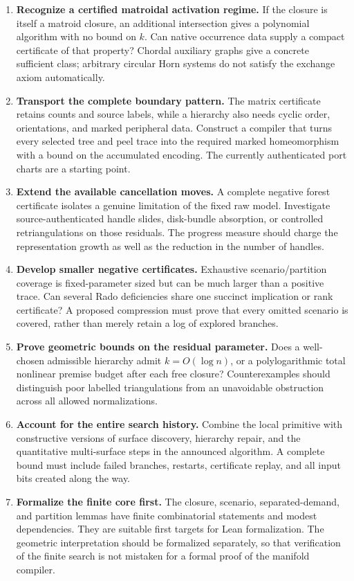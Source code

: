 \begin{enumerate}[leftmargin=*,label=\textbf{\arabic*.}]
\item \textbf{Recognize a certified matroidal activation regime.}
If the closure is itself a matroid closure, an additional intersection
gives a polynomial algorithm with no bound on $k$. Can native occurrence
data supply a compact certificate of that property? Chordal auxiliary
graphs give a concrete sufficient class; arbitrary circular Horn systems
do not satisfy the exchange axiom automatically.

\item \textbf{Transport the complete boundary pattern.}
The matrix certificate retains counts and source labels, while a hierarchy
also needs cyclic order, orientations, and marked peripheral data.
Construct a compiler that turns every selected tree and peel trace into
the required marked homeomorphism with a bound on the accumulated encoding.
The currently authenticated port charts are a starting point.

\item \textbf{Extend the available cancellation moves.}
A complete negative forest certificate isolates a genuine limitation of
the fixed raw model. Investigate source-authenticated handle slides,
disk-bundle absorption, or controlled retriangulations on those residuals.
The progress measure should charge the representation growth as well as
the reduction in the number of handles.

\item \textbf{Develop smaller negative certificates.}
Exhaustive scenario/partition coverage is fixed-parameter sized but can
be much larger than a positive trace. Can several Rado deficiencies share
one succinct implication or rank certificate? A proposed compression must
prove that every omitted scenario is covered, rather than merely retain
a log of explored branches.

\item \textbf{Prove geometric bounds on the residual parameter.}
Does a well-chosen admissible hierarchy admit $k=O(\log n)$, or a
polylogarithmic total nonlinear premise budget after each free closure?
Counterexamples should distinguish poor labelled triangulations from an
unavoidable obstruction across all allowed normalizations.

\item \textbf{Account for the entire search history.}
Combine the local primitive with constructive versions of surface
discovery, hierarchy repair, and the quantitative multi-surface steps in
the announced algorithm. A complete bound must include failed branches,
restarts, certificate replay, and all input bits created along the way.

\item \textbf{Formalize the finite core first.}
The closure, scenario, separated-demand, and partition lemmas have finite
combinatorial statements and modest dependencies. They are suitable first
targets for Lean formalization. The geometric interpretation should be
formalized separately, so that verification of the finite search is not
mistaken for a formal proof of the manifold compiler.
\end{enumerate}
